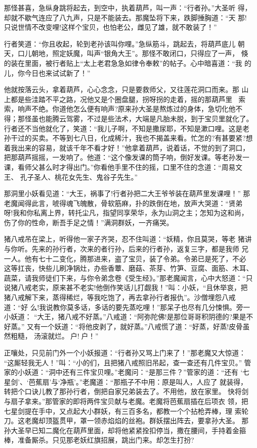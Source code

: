 那怪甚喜，急纵身跳将起去，到空中，执着葫芦，叫一声：“行者孙。”大圣听
得，却就不歇气连应了八九声，只是不能装去。那魔坠将下来，跌脚捶胸道：“天
那!只说世情不改变哩!这样个宝贝，也怕老公，雌见了雄，就不敢装了！”

行者笑道：“你且收起，轮到老孙该叫你哩。”急纵筋斗，跳起去，将葫芦底儿
朝天，口儿朝地，照定妖魔，叫声“银角大王”。那怪不敢闭口，只得应了一声，
倏的装在里面，被行者贴上“太上老君急急如律令奉敕”的帖子。心中暗喜道：“我
的儿，你今日也来试试新了！”

他就按落云头，拿着葫芦，心心念念，只是要救师父，又往莲花洞口而来。那
山上都是些洼踏不平之路，况他又是个圈盘腿，拐呀拐的走着，摇的那葫芦里
索索，响声不绝。你道他怎么便有响声?原来孙大圣是熬炼过的身体，急切化他不
得；那怪虽也能腾云驾雾，不过是些法术，大端是凡胎未脱，到于宝贝里就化了。
行者还不当他就化了，笑道：“我儿子啊，不知是撒尿耶，不知是漱口哩。这是老
孙干过的买卖。不等到七八日，化成稀汁，我也不揭盖来看。忙怎的?有甚要紧?想
着我出来的容易，就该千年不看才好！”他拿着葫芦，说着话，不觉的到了洞口，
把那葫芦摇摇，一发响了。他道：“这个像发课的筒子响，倒好发课。等老孙发一
课，看师父甚么时才得出门。”你看他手里不住的摇，口里不住的念道：“周易文王、
孔子圣人、桃花女先生、鬼谷子先生。”

那洞里小妖看见道：“大王，祸事了!行者孙把二大王爷爷装在葫芦里发课哩！”
那老魔闻得此言，唬得魂飞魄散，骨软筋麻，扑的跌倒在地，放声大哭道：“贤弟
呀!我和你私离上界，转托尘凡，指望同享荣华，永为山洞之主；怎知为这和尚，
伤了你的性命，断吾手足之情！”满洞群妖，一齐痛哭。

猪八戒吊在梁上，听得他一家子齐哭，忍不住叫道：“妖精，你且莫哭，等老
猪讲与你听。先来的孙行者，次来的者行孙，后来的行者孙，返复三字，都是我师
兄一人。他有七十二变化，腾那进来，盗了宝贝，装了令弟。令弟已是死了，不必
这等扛丧，快些儿刷净锅灶，办些香蕈、磨菇、茶芽、竹笋、豆腐、面筋、木耳、
蔬菜，请我师徒们下来，与你令弟念卷《受生经》。”那老魔闻言，心中大怒道：“只
说猪八戒老实，原来甚不老实!他倒作笑话儿打觑我！”叫：小妖，“且休举哀，把
猪八戒解下来，蒸得稀烂，等我吃饱了，再去拿孙行者报仇”。沙僧埋怨八戒道：“好
么!我说教你莫多话，多话的要先蒸吃哩！”那呆子也尽有几分悚惧。旁一小妖道：
“大王，猪八戒不好蒸。”八戒道：“阿弥陀佛!是那位哥哥积阴德的?果是不好蒸。”
又有一个妖道：“将他皮剥了，就好蒸。”八戒慌了道：“好蒸，好蒸!皮骨虽然粗糙，
汤滚就烂。户!户！”

正嚷处，只见前门外一个小妖报道：“行者孙又骂上门来了！”那老魔又大惊道：
“这厮轻我无人！”叫：“小的们，且把猪八戒照旧吊起，查一查还有几件宝贝。”
管家的小妖道：“洞中还有三件宝贝哩。”老魔问：“是那三件？”管家的道：“还有
‘七星剑’、‘芭蕉扇’与‘净瓶’。”老魔道：“那瓶子不中用：原是叫人，人应了
就装得，转把个口诀儿教了那孙行者，倒把自家兄弟装去了。不用他，放在家里。
快将剑与扇子拿来。”那管家的即将两件宝贝献与老魔。老魔将芭蕉扇插在后项衣
领，把七星剑提在手中，又点起大小群妖，有三百多名，都教一个个拈枪弄棒，理
索轮刀。这老魔却顶盔贯甲，罩一领赤焰焰的丝袍。群妖摆出阵去，要拿孙大圣。
那孙大圣早已知二魔化在葫芦里面，却将他紧紧拴扣停当，撒在腰间，手持着金箍
棒，准备厮杀。只见那老妖红旗招展，跳出门来。却怎生打扮?

